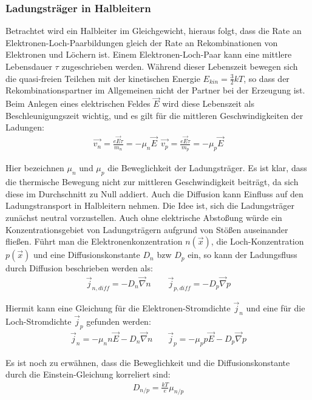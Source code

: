 \documentclass[12pt]{article}
\begin{document}
\subsubsection{Ladungsträger in Halbleitern}
Betrachtet wird ein Halbleiter im Gleichgewicht, hieraus folgt, dass die Rate an Elektronen-Loch-Paarbildungen gleich der Rate an Rekombinationen von Elektronen und Löchern ist. Einem Elektronen-Loch-Paar kann eine mittlere Lebensdauer $\tau$ zugeschrieben werden. Während dieser Lebenszeit bewegen sich die quasi-freien Teilchen mit der kinetischen Energie $E_{kin}= \frac{3}{2} k T$, so dass der Rekombinationspartner im Allgemeinen nicht der Partner bei der Erzeugung ist. Beim Anlegen eines elektrischen Feldes $\vec{E}$ wird diese Lebenszeit als Beschleunigungszeit wichtig, und es gilt für die mittleren Geschwindigkeiten der Ladungen:
\begin{align}
 \vec{v_n}= \frac{e \vec{E} \tau}{m_n} = -\mu_n \vec{E} ~ ~ \vec{v_p}= \frac{e \vec{E} \tau}{m_p}= -\mu_p \vec{E}
\end{align}

Hier bezeichnen $\mu_n$ und $\mu_p$ die Beweglichkeit der Ladungsträger. Es ist klar, dass die thermische Bewegung nicht zur mittleren Geschwindigkeit beiträgt, da sich diese im Durchschnitt zu Null addiert. Auch die Diffusion kann Einfluss auf den Ladungstransport in Halbleitern nehmen. Die Idee ist, sich die Ladungsträger zunächst neutral vorzustellen. Auch ohne elektrische Abstoßung würde ein Konzentrationsgebiet von Ladungsträgern aufgrund von Stößen auseinander fließen. Führt man die Elektronenkonzentration $n(\vec{x})$, die Loch-Konzentration $p(\vec{x})$ und eine Diffusionskonstante $D_n$ bzw $D_p$ ein, so kann der Ladungsfluss durch Diffusion beschrieben werden als:
\begin{align}
 \vec{j}_{n,diff}=-D_n \vec{\nabla} n ~~~~~~~~~ \vec{j}_{p,diff}=-D_p \vec{\nabla} p
\end{align}

Hiermit kann eine Gleichung für die Elektronen-Stromdichte $\vec{j}_n$ und eine für die Loch-Stromdichte $\vec{j}_p$ gefunden werden:
\begin{align}
\label{Stromdichten}
 \vec{j}_n=- \mu_n n \vec{E} -  D_n \vec{\nabla} n ~~~~~~~~ \vec{j}_p=- \mu_p p \vec{E} -  D_p \vec{\nabla} p
\end{align}

Es ist noch zu erwähnen, dass die Beweglichkeit und die Diffusionskonstante durch die Einstein-Gleichung korreliert sind:
\begin{align}
 D_{n/p}=\frac{kT}{e}\mu_{n/p}
\end{align}
\end{document}
